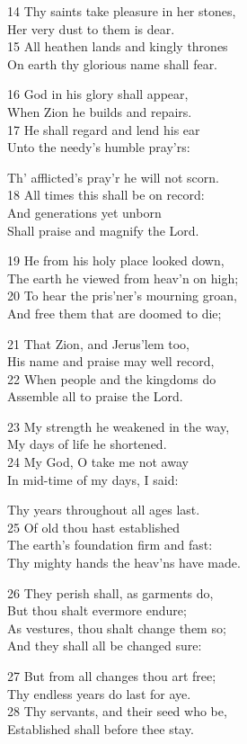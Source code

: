 14 Thy saints take pleasure in her stones,\\
Her very dust to them is dear.\\
15 All heathen lands and kingly thrones\\
On earth thy glorious name shall fear.

16 God in his glory shall appear,\\
When Zion he builds and repairs.\\
17 He shall regard and lend his ear\\
Unto the needy’s humble pray’rs:

Th’ afflicted’s pray’r he will not scorn.\\
18 All times this shall be on record:\\
And generations yet unborn\\
Shall praise and magnify the Lord.

19 He from his holy place looked down,\\
The earth he viewed from heav’n on high;\\
20 To hear the pris’ner’s mourning groan,\\
And free them that are doomed to die;

21 That Zion, and Jerus’lem too,\\
His name and praise may well record,\\
22 When people and the kingdoms do\\
Assemble all to praise the Lord.

23 My strength he weakened in the way,\\
My days of life he shortened.\\
24 My God, O take me not away\\
In mid-time of my days, I said:

Thy years throughout all ages last.\\
25 Of old thou hast established\\
The earth’s foundation firm and fast:\\
Thy mighty hands the heav’ns have made.

26 They perish shall, as garments do,\\
But thou shalt evermore endure;\\
As vestures, thou shalt change them so;\\
And they shall all be changed sure:

27 But from all changes thou art free;\\
Thy endless years do last for aye.\\
28 Thy servants, and their seed who be,\\
Established shall before thee stay.


